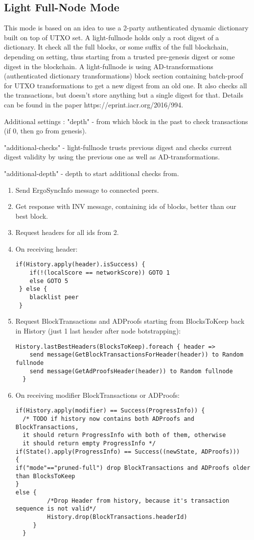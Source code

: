 \documentclass[]{report}   %
\begin{document}
\subsection{Light Full-Node Mode}
This mode is based on an idea to use a 2-party authenticated dynamic dictionary built on top of UTXO set. A light-fullnode holds only a root digest of a dictionary. It check all the full blocks, or some suffix of the full blockchain, depending on setting, thus starting from a trusted pre-genesis digest or some digest in the blockchain. A light-fullnode is using AD-transformations (authenticated dictionary transformations) block section containing batch-proof for UTXO transformations to get a new digest from an old one. It also checks all the transactions, but doesn’t store anything but a single digest for that. Details can be found in the paper https://eprint.iacr.org/2016/994. \par
Additional settings : "depth" - from which block in the past to check transactions (if 0, then go from genesis). \par
"additional-checks" - light-fullnode trusts previous digest and checks current digest validity by using the previous one as well as AD-transformations. \par
"additional-depth" - depth to start additional checks from.
\begin{enumerate}
\item Send ErgoSyncInfo message to connected peers.
\item Get response with INV message, containing ids of blocks, better than our best block.
\item Request headers for all ids from 2.
\item On receiving header:
\begin{verbatim}
if(History.apply(header).isSuccess) {
    if(!(localScore == networkScore)) GOTO 1
    else GOTO 5
 } else {
    blacklist peer
 }
\end{verbatim}
\item Request BlockTransactions and ADProofs starting from BlocksToKeep back in History (just 1 last header after node botstrapping):
\begin{verbatim}
History.lastBestHeaders(BlocksToKeep).foreach { header => 
    send message(GetBlockTransactionsForHeader(header)) to Random fullnode
    send message(GetAdProofsHeader(header)) to Random fullnode
  }
\end{verbatim}
\item On receiving modifier BlockTransactions or ADProofs:
\begin{verbatim}
if(History.apply(modifier) == Success(ProgressInfo)) {
  /* TODO if history now contains both ADProofs and BlockTransactions,
  it should return ProgressInfo with both of them, otherwise
  it should return empty ProgressInfo */
if(State().apply(ProgressInfo) == Success((newState, ADProofs)))
{
if("mode"=="pruned-full") drop BlockTransactions and ADProofs older than BlocksToKeep
} 
else {
         /*Drop Header from history, because it's transaction sequence is not valid*/
         History.drop(BlockTransactions.headerId)
     }
  }
\end{verbatim}
\end{enumerate}
\end{document}

